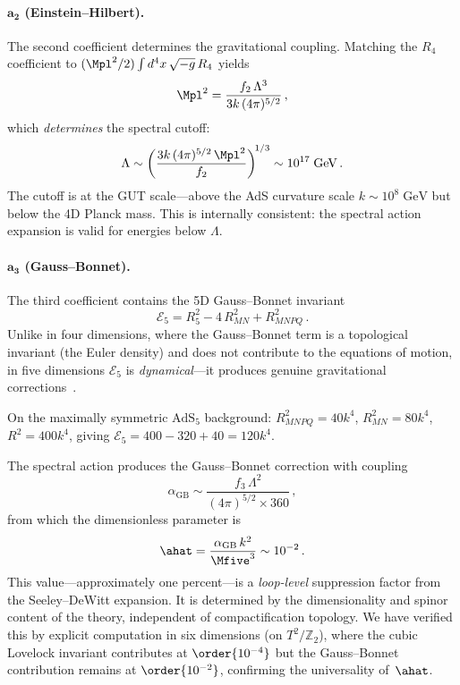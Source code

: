 \paragraph{$\bm{a_2}$ (Einstein--Hilbert).} The second coefficient determines the gravitational coupling. Matching the $R_4$ coefficient to $(\Mpl^2/2)\int d^4x\, \sqrt{-g}\, R_4$ yields
\begin{equation}
\label{eq:1-mpl-spectral}
\Mpl^2 = \frac{f_2\, \Lambda^3}{3k\,(4\pi)^{5/2}}\,,
\end{equation}
which \emph{determines} the spectral cutoff:
\begin{equation}
\label{eq:1-cutoff}
\Lambda \sim \left(\frac{3k\,(4\pi)^{5/2}\, \Mpl^2}{f_2}\right)^{\!1/3} \sim 10^{17}\;\mathrm{GeV}\,.
\end{equation}
The cutoff is at the GUT scale---above the AdS curvature scale $k \sim 10^8\;\mathrm{GeV}$ but below the 4D Planck mass. This is internally consistent: the spectral action expansion is valid for energies below $\Lambda$.

\paragraph{$\bm{a_3}$ (Gauss--Bonnet).} The third coefficient contains the 5D Gauss--Bonnet invariant
\begin{equation}
\label{eq:1-gb-invariant}
\mathcal{E}_5 = R_5^2 - 4\, R_{MN}^2 + R_{MNPQ}^2\,.
\end{equation}
Unlike in four dimensions, where the Gauss--Bonnet term is a topological invariant (the Euler density) and does not contribute to the equations of motion, in five dimensions $\mathcal{E}_5$ is \emph{dynamical}---it produces genuine gravitational corrections~\cite{ch1:davis03}.

On the maximally symmetric $\mathrm{AdS}_5$ background: $R_{MNPQ}^2 = 40k^4$, $R_{MN}^2 = 80k^4$, $R^2 = 400k^4$, giving $\mathcal{E}_5 = 400 - 320 + 40 = 120k^4$.

The spectral action produces the Gauss--Bonnet correction with coupling
\begin{equation}
\label{eq:1-alpha-gb}
\alpha_{\mathrm{GB}} \sim \frac{f_3\, \Lambda^2}{(4\pi)^{5/2} \times 360}\,,
\end{equation}
from which the dimensionless parameter is
\begin{equation}
\label{eq:1-alpha-hat}
\ahat = \frac{\alpha_{\mathrm{GB}}\, k^2}{\Mfive^3} \sim 10^{-2}\,.
\end{equation}
This value---approximately one percent---is a \emph{loop-level} suppression factor from the Seeley--DeWitt expansion. It is determined by the dimensionality and spinor content of the theory, independent of compactification topology. We have verified this by explicit computation in six dimensions (on $T^2/\mathbb{Z}_2$), where the cubic Lovelock invariant contributes at $\order{10^{-4}}$ but the Gauss--Bonnet contribution remains at $\order{10^{-2}}$, confirming the universality of~$\ahat$.

